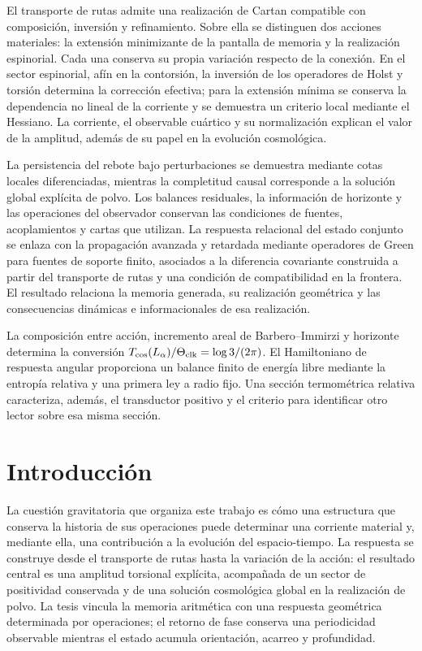 El transporte de rutas admite una realización de Cartan compatible con
composición, inversión y refinamiento. Sobre ella se distinguen dos
acciones materiales: la extensión minimizante de la pantalla de memoria
y la realización espinorial. Cada una conserva su propia variación
respecto de la conexión. En el sector espinorial, afín en la contorsión,
la inversión de los operadores de Holst y torsión determina la corrección
efectiva; para la extensión mínima se conserva la dependencia no lineal
de la corriente y se demuestra un criterio local mediante el Hessiano.
La corriente, el observable cuártico y su normalización explican el
valor de la amplitud, además de su papel en la evolución cosmológica.

La persistencia del rebote bajo perturbaciones se demuestra mediante
cotas locales diferenciadas, mientras la completitud causal corresponde
a la solución global explícita de polvo. Los balances residuales, la
información de horizonte y las operaciones del observador conservan las
condiciones de fuentes, acoplamientos y cartas que utilizan. La respuesta
relacional del estado conjunto se enlaza con la propagación avanzada y
retardada mediante operadores de Green para fuentes de soporte finito,
asociados a la diferencia covariante
construida a partir del transporte de rutas y una condición de
compatibilidad en la frontera. El resultado relaciona la memoria
generada, su realización geométrica y las consecuencias dinámicas e
informacionales de esa realización.

La composición entre acción, incremento areal de Barbero--Immirzi y
horizonte determina la conversión
\(T_{\rm cos}(L_\alpha)/\Theta_{\rm clk}=\log3/(2\pi)\).
El Hamiltoniano de respuesta angular proporciona un balance finito de
energía libre mediante la entropía relativa y una primera ley a radio
fijo. Una sección termométrica relativa caracteriza, además, el
transductor positivo y el criterio para identificar otro lector sobre
esa misma sección.
\par\endgroup
\clearpage

\section{Introducción}
\label{vii:sec:introduccion}

La cuestión gravitatoria que organiza este trabajo es cómo una estructura
que conserva la historia de sus operaciones puede determinar una
corriente material y, mediante ella, una contribución a la evolución del
espacio-tiempo. La respuesta se construye desde el transporte de rutas
hasta la variación de la acción: el resultado central es una amplitud
torsional explícita, acompañada de un sector de positividad conservada y
de una solución cosmológica global en la realización de polvo. La tesis
vincula la memoria aritmética con una respuesta geométrica determinada por
operaciones; el retorno de fase conserva una periodicidad observable
mientras el estado acumula orientación, acarreo y profundidad.

